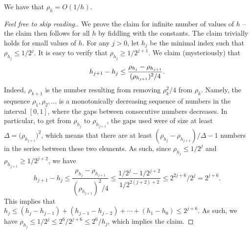 \begin{lemma}
    We have that $\rho_h =O( 1/h)$.
\end{lemma}


\begin{proof}[Feel free to skip reading.]
    We prove the claim for infinite number of values of $h$ -- the
    claim then follows for all $h$ by fiddling with the constants.
    The claim trivially holds for small values of $h$. For any
    $j > 0$, let $h_j$ be the minimal index such that
    $\rho_{h_j} \leq 1/2^j$.  It is easy to verify that
    $\rho_{h_j} \geq 1/2^{j+1}$.  We claim (mysteriously) that
    \begin{equation*}
        \ds h_{j+1} - h_j%
        \leq%
        \frac{\rho_{h_{j}} - \rho_{h_{j+1}}} { (\rho_{h_{j+1}} )^2/4
        }.%
    \end{equation*}
    Indeed, $\rho_{k+1}$ is the number resulting from removing
    $\rho_k^2/4$ from $\rho_k$. Namely, the sequence
    $\rho_1, \rho_2, \ldots$ is a monotonically decreasing sequence of
    numbers in the interval $[0,1]$, where the gaps between
    consecutive numbers decreases. In particular, to get from
    $\rho_{h_{j}}$ to $\rho_{h_{j+1}}$, the gaps used were of size at
    least $\Delta = \bigl(\rho_{h_{j+1}} \bigr)^2$, which means that
    there are at least $(\rho_{h_{j}} - \rho_{h_{j+1}}) / \Delta - 1$
    numbers in the series between these two elements. As such, since
    $\rho_{h_{j}} \leq 1/2^{j}$ and $\rho_{h_{j+1}} \geq 1/2^{j+2}$,
    we have
    \begin{equation*}
        h_{j+1} - h_j%
        \leq%
        \frac{\rho_{h_{j}} - \rho_{h_{j+1}}} {
           ( \rho_{h_{j+1}} )^2/4 }%
        \leq%
        \frac{1/2^{j} - 1/2^{j+2}} { 1/2^{2(j+2)+2}}%
        \leq%
        2^{2j + 6} /2^{j}
        =%
        2^{j+6}.
    \end{equation*}
    This implies that 
    \begin{math}
        h_j \leq (h_j - h_{j-1}) + (h_{j-1} - h_{j-2}) + \cdots + (h_1
        - h_0) \leq 2^{j+6}.
    \end{math}
    As such, we have
    $\rho_{h_j} \leq 1/2^{j} \leq 2^6/2^{j+6} \leq 2^6/h_j$, which
    implies the claim.
\end{proof}




